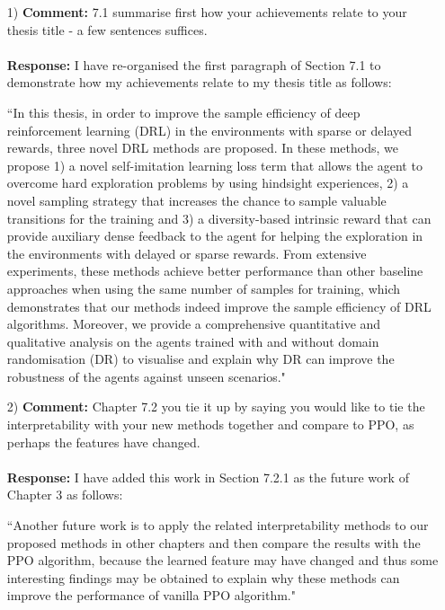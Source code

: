 \documentclass[11pt]{article}
\begin{document}
\begin{enumerate}
\item[1)] \textbf{Comment:} 7.1 summarise first how your achievements relate to your thesis title - a few sentences suffices.\\ \\
\textbf{Response:} I have re-organised the first paragraph of Section 7.1 to demonstrate how my achievements relate to my thesis title as follows:

``In this thesis, in order to improve the sample efficiency of deep reinforcement learning (DRL) in the environments with sparse or delayed rewards, three novel DRL methods are proposed. In these methods, we propose 1) a novel self-imitation learning loss term that allows the agent to overcome hard exploration problems by using hindsight experiences, 2) a novel sampling strategy that increases the chance to sample valuable transitions for the training and 3) a diversity-based intrinsic reward that can provide auxiliary dense feedback to the agent for helping the exploration in the environments with delayed or sparse rewards. From extensive experiments, these methods achieve better performance than other baseline approaches when using the same number of samples for training, which demonstrates that our methods indeed improve the sample efficiency of DRL algorithms. Moreover, we provide a comprehensive quantitative and qualitative analysis on the agents trained with and without domain randomisation (DR) to visualise and explain why DR can improve the robustness of the agents against unseen scenarios."

\item[2)] \textbf{Comment:} Chapter 7.2 you tie it up by saying you would like to tie the interpretability with your new methods together and compare to PPO, as perhaps the features have changed.\\ \\
\textbf{Response:} I have added this work in Section 7.2.1 as the future work of Chapter 3 as follows:

``Another future work is to apply the related interpretability methods to our proposed methods in other chapters and then compare the results with the PPO algorithm, because the learned feature may have changed and thus some interesting findings may be obtained to explain why these methods can improve the performance of vanilla PPO algorithm."
\end{enumerate}
\end{document}
